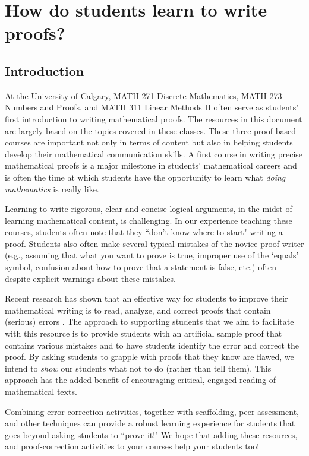 \documentclass[12pt]{book}
\begin{document}
\chapter{How do students learn to write proofs?}
\section{Introduction}\label{sec-intro}
At the University of Calgary, MATH 271 Discrete Mathematics, MATH 273 Numbers and Proofs, and MATH 311 Linear Methods II often serve as students' first introduction to writing mathematical proofs.  The resources in this document are largely based on the topics covered in these classes.  These three proof-based courses are important not only in terms of content but also in helping students develop their mathematical communication skills.  A first course in writing precise mathematical proofs is a major milestone in students' mathematical careers and is often the time at which students have the opportunity to learn what \emph{doing mathematics} is really like.  

Learning to write rigorous, clear and concise logical arguments, in the midst of learning mathematical content, is challenging.
  In our experience teaching these courses, students often note that they ``don't know where to start" writing a proof.  
  Students also often make several typical mistakes of the novice proof writer  
  (e.g., assuming that what you want to prove is true, improper use of the `equals' symbol, confusion about how to prove that a statement is false, etc.) often despite explicit warnings about these mistakes.

Recent research has shown that an effective way for students to improve their mathematical writing is to read, analyze, and correct proofs that contain (serious) errors \cite{Selden_2003}.  
The approach to supporting students that we aim to facilitate with this resource is to provide students with an artificial sample proof that contains various mistakes and to have students identify the error and correct the proof.   
By asking students to grapple with proofs that they know are flawed, we intend to \emph{show} our students what not to do (rather than tell them).  
This approach has the added benefit of encouraging critical, engaged reading of mathematical texts.  

Combining error-correction activities, together with scaffolding, peer-assessment, and other techniques can provide a robust learning experience for students that goes beyond asking students to ``prove it!" We hope that adding these resources, and proof-correction activities to your courses help your students too!
\end{document}
